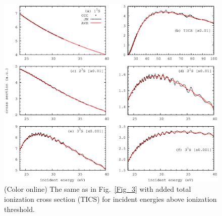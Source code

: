 \documentclass[aip
, pra
, showpacs
, aps
, twocolumn
, groupedaddress
, floatfix
]{revtex4}
\begin{document}
\begin{figure}[htb]
\includegraphics[scale=1]{fig4.ps}
\caption{(Color online)
The same as in Fig.~\ref{Fig_3} with added total ionization cross section (TICS)
for incident energies above ionization threshold.
}
\label{Fig_4}
\end{figure}
\end{document}
